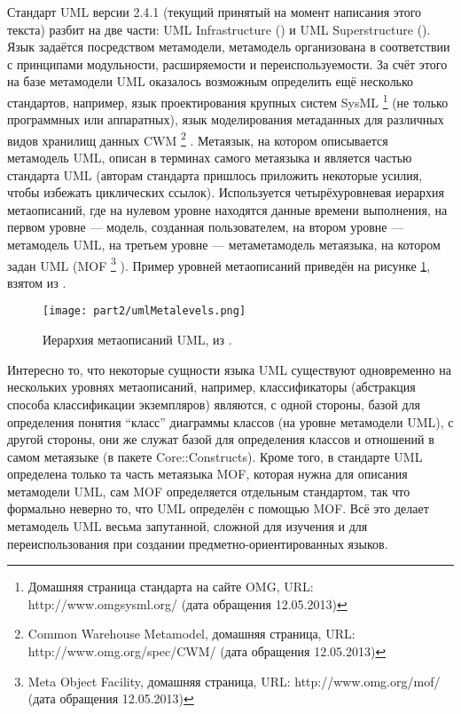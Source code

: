 Стандарт UML версии 2.4.1 (текущий принятый на момент написания этого текста) разбит 
на две части: UML Infrastructure (\cite{omg2011infrastructure}) и UML Superstructure 
(\cite{omg2011superstructure}). Язык задаётся посредством метамодели, метамодель организована 
в соответствии с принципами модульности, расширяемости и переиспользуемости. За счёт 
этого на базе метамодели UML оказалось возможным определить ещё несколько стандартов, например, язык проектирования крупных систем SysML
\footnote{Домашняя страница стандарта на сайте OMG, URL: http://www.omgsysml.org/ (дата обращения 12.05.2013)}
(не только программных или аппаратных), язык моделирования метаданных для различных видов хранилищ данных CWM
\footnote{Common Warehouse Metamodel, домашняя страница, URL: http://www.omg.org/spec/CWM/ (дата обращения 12.05.2013)}
. Метаязык, на котором описывается метамодель UML, описан в терминах самого метаязыка и является 
частью стандарта UML (авторам стандарта пришлось приложить некоторые усилия, чтобы 
избежать циклических ссылок). Используется четырёхуровневая иерархия метаописаний, 
где на нулевом уровне находятся данные времени выполнения, на первом уровне --- модель, 
созданная пользователем, на втором уровне --- метамодель UML, на третьем уровне --- метаметамодель метаязыка, на котором задан UML (MOF
\footnote{Meta Object Facility, домашняя страница, URL: http://www.omg.org/mof/ (дата обращения 12.05.2013)}
). Пример уровней метаописаний приведён на рисунке \ref{umlMetalevels}, взятом из \cite{omg2011infrastructure}.

\begin{figure} [ht]
	\begin{center}
		\texttt{[image: part2/umlMetalevels.png]}
		\caption{Иерархия метаописаний UML, из \cite{omg2011infrastructure}.}
		\label{umlMetalevels}
	\end{center}
\end{figure}

Интересно то, что некоторые сущности языка UML существуют одновременно на нескольких 
уровнях метаописаний, например, классификаторы (абстракция способа классификации экземпляров) 
являются, с одной стороны, базой для определения понятия "`класс"' диаграммы классов 
(на уровне метамодели UML), с другой стороны, они же служат базой для определения 
классов и отношений в самом метаязыке (в пакете Core::Constructs). Кроме того, в стандарте 
UML определена только та часть метаязыка MOF, которая нужна для описания метамодели UML, 
сам MOF определяется отдельным стандартом, так что формально неверно то, что UML определён 
с помощью MOF. Всё это делает метамодель UML весьма запутанной, сложной для изучения 
и для переиспользования при создании предметно-ориентированных языков. 

